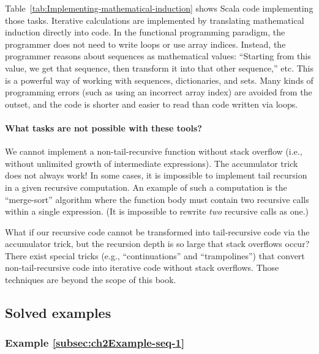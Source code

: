 \noindent Table~\ref{tab:Implementing-mathematical-induction} shows
Scala code implementing those tasks. Iterative calculations are implemented
by translating mathematical induction directly into code. In the functional
programming paradigm, the programmer does not need to write loops
or use array indices. Instead, the programmer reasons about sequences
as mathematical values: \textsf{``}Starting from this value, we get that sequence,
then transform it into that other sequence,\textsf{''} etc. This is a powerful
way of working with sequences, dictionaries, and sets. Many kinds
of programming errors (such as using an incorrect array index) are
avoided from the outset, and the code is shorter and easier to read
than code written via loops.

\paragraph*{What tasks are not possible with these tools?}

We cannot implement a non-tail-recursive function without stack overflow
(i.e., without unlimited growth of intermediate expressions). The
accumulator trick does not always work! In some cases, it is impossible
to implement tail recursion in a given recursive computation. An example
of such a computation is the \textsf{``}merge-sort\textsf{''} algorithm where the
function body must contain two recursive calls within a single expression.
(It is impossible to rewrite \emph{two} recursive calls as one.) 

What if our recursive code cannot be transformed into tail-recursive
code via the accumulator trick, but the recursion depth is so large
that stack overflows occur? There exist special tricks (e.g., \textsf{``}continuations\textsf{''}
and \textsf{``}trampolines\textsf{''}) that convert non-tail-recursive
code into iterative code without stack overflows. Those techniques
are beyond the scope of this book.

\subsection{Solved examples}

\subsubsection{Example \label{subsec:ch2Example-seq-1}\ref{subsec:ch2Example-seq-1}}

